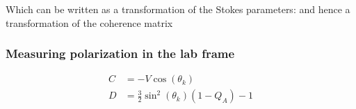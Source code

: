 



	Which can be written as a transformation of the Stokes parameters:
	and hence a transformation of the coherence matrix  


	\subsubsection{Measuring polarization in the lab frame}


\begin{align}
C &= -V\cos(\theta_k)\\
 D &= \frac{3}{2}\sin^2(\theta_k)(1-Q_A)-1
\end{align}






